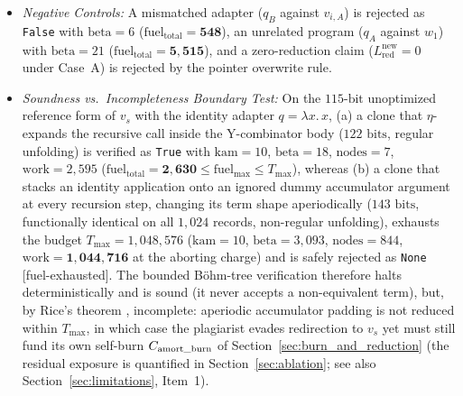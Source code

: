 \documentclass[runningheads,a4paper]{llncs}
\renewcommand{\_}{\textunderscore\allowbreak}
\begin{document}
\begin{enumerate}
\begin{itemize}
    \item \emph{Negative Controls:} A mismatched adapter ($q_B$ against $v_{i,A}$) is rejected as \texttt{False} with $\text{beta} = 6$ ($\text{fuel}_{\text{total}} = \mathbf{548}$), an unrelated program ($q_A$ against $w_1$) with $\text{beta} = 21$ ($\text{fuel}_{\text{total}} = \mathbf{5,515}$), and a zero-reduction claim ($L_{\text{red}}^{\text{new}} = 0$ under Case~A) is rejected by the pointer overwrite rule.
    \item \emph{Soundness vs.\ Incompleteness Boundary Test:} On the $115\text{-bit}$ unoptimized reference form of $v_s$ with the identity adapter $q = \lambda x.\,x$, (a) a clone that $\eta$-expands the recursive call inside the Y-combinator body ($122\text{ bits}$, regular unfolding) is verified as \texttt{True} with $\text{kam} = 10$, $\text{beta} = 18$, $\text{nodes} = 7$, $\text{work} = 2,595$ ($\text{fuel}_{\text{total}} = \mathbf{2,630} \le \text{fuel}_{\max} \le T_{\max}$), whereas (b) a clone that stacks an identity application onto an ignored dummy accumulator argument at every recursion step, changing its term shape aperiodically ($143\text{ bits}$, functionally identical on all $1,024$ records, non-regular unfolding), exhausts the budget $T_{\max} = 1,048,576$ ($\text{kam} = 10$, $\text{beta} = 3,093$, $\text{nodes} = 844$, $\text{work} = \mathbf{1,044,716}$ at the aborting charge) and is safely rejected as \texttt{None} [fuel-exhausted]. The bounded B\"ohm-tree verification therefore halts deterministically and is sound (it never accepts a non-equivalent term), but, by Rice's theorem \cite{li2019}, incomplete: aperiodic accumulator padding is not reduced within $T_{\max}$, in which case the plagiarist evades redirection to $v_s$ yet must still fund its own self-burn $C_{\text{amort\_burn}}$ of Section~\ref{sec:burn_and_reduction} (the residual exposure is quantified in Section~\ref{sec:ablation}; see also Section~\ref{sec:limitations}, Item~1).
  \end{itemize}
\end{enumerate}
\end{document}
